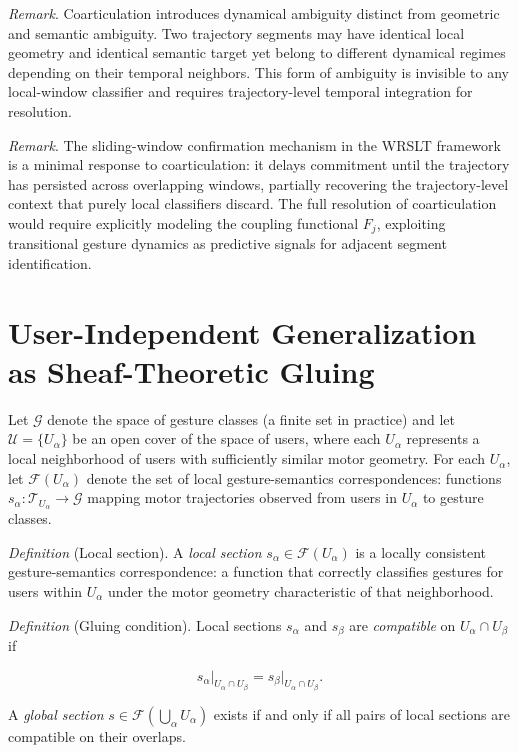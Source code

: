\documentclass[11pt, a4paper]{article}
\theoremstyle{definition}
\begin{document}
\textit{Remark}. Coarticulation introduces dynamical ambiguity distinct from geometric and semantic ambiguity. Two trajectory segments may have identical local geometry and identical semantic target yet belong to different dynamical regimes depending on their temporal neighbors. This form of ambiguity is invisible to any local-window classifier and requires trajectory-level temporal integration for resolution.

\textit{Remark}. The sliding-window confirmation mechanism in the WRSLT framework is a minimal response to coarticulation: it delays commitment until the trajectory has persisted across overlapping windows, partially recovering the trajectory-level context that purely local classifiers discard. The full resolution of coarticulation would require explicitly modeling the coupling functional $F_j$, exploiting transitional gesture dynamics as predictive signals for adjacent segment identification.

\section{User-Independent Generalization as Sheaf-Theoretic Gluing}
\label{app:sheaf}

Let $\mathcal{G}$ denote the space of gesture classes (a finite set in practice) and let $\mathcal{U} = \{U_\alpha\}$ be an open cover of the space of users, where each $U_\alpha$ represents a local neighborhood of users with sufficiently similar motor geometry. For each $U_\alpha$, let $\mathcal{F}(U_\alpha)$ denote the set of local gesture-semantics correspondences: functions $s_\alpha : \mathcal{T}_{U_\alpha} \to \mathcal{G}$ mapping motor trajectories observed from users in $U_\alpha$ to gesture classes.

\textit{Definition} (Local section). A \emph{local section} $s_\alpha \in \mathcal{F}(U_\alpha)$ is a locally consistent gesture-semantics correspondence: a function that correctly classifies gestures for users within $U_\alpha$ under the motor geometry characteristic of that neighborhood.

\textit{Definition} (Gluing condition). Local sections $s_\alpha$ and $s_\beta$ are \emph{compatible} on $U_\alpha \cap U_\beta$ if

\[
s_\alpha\big|_{U_\alpha \cap U_\beta} = s_\beta\big|_{U_\alpha \cap U_\beta}.
\]

A \emph{global section} $s \in \mathcal{F}(\bigcup_\alpha U_\alpha)$ exists if and only if all pairs of local sections are compatible on their overlaps.
\end{document}

